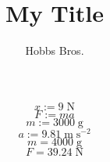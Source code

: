\documentclass[12pt]{article}
\begin{document}
\title{My Title}
\author{Hobbs Bros.}
\maketitle
$$
x := 9 \; \mathrm{N}
$$
$$
F := m a
$$
$$
m := 3000 \; \mathrm{g}
$$
$$
a := 9.81 \; \mathrm{m} \; \mathrm{s^{-2}}
$$
$$
m = 4000 \; \mathrm{g}
$$
$$
F = 39.24 \; \mathrm{N}
$$
\end{document}
